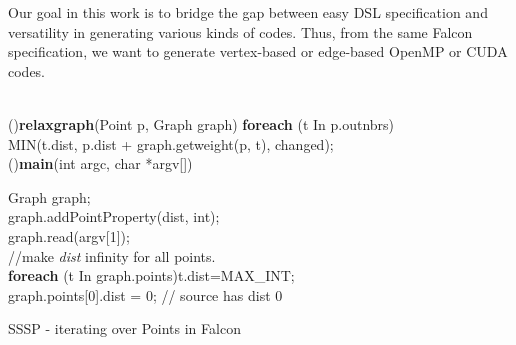\documentclass[12pt]{article}
\begin{document}
Our goal in this work is to bridge the gap between easy DSL specification and versatility in generating various kinds of codes.
Thus, from the same Falcon specification, we want to generate vertex-based or edge-based OpenMP or CUDA codes.


\begin{algorithm}
\small
{}
\fontsize{10pt}{7pt}\\
\Fn(){\textbf{relaxgraph}(Point  p, Graph  graph)} {
                        \textbf{foreach} (t In p.outnbrs)\\
        \hspace{0.05in} MIN(t.dist, p.dist + graph.getweight(p, t), changed);    \label{line:modidist}\\%
}
\Fn(){\textbf{main}(int argc, char *argv[])} {
        Graph graph;    \\
        graph.addPointProperty(dist, int);      \label{line:add-dist}\\
        graph.read(argv[1]);            \label{line:readgraph}  \\
        //make {\it dist} infinity for all points.\\
        \textbf{foreach} (t In graph.points)t.dist=MAX\_INT;     \label{line:infinity}\\
        graph.points[0].dist = 0;       // source has dist 0    \label{line:initsource} \\
        \label{line:ssspendlopp}

        }
\caption{SSSP - iterating over Points in Falcon}
\label{background:algo1}
        \end{algorithm}
\end{document}
